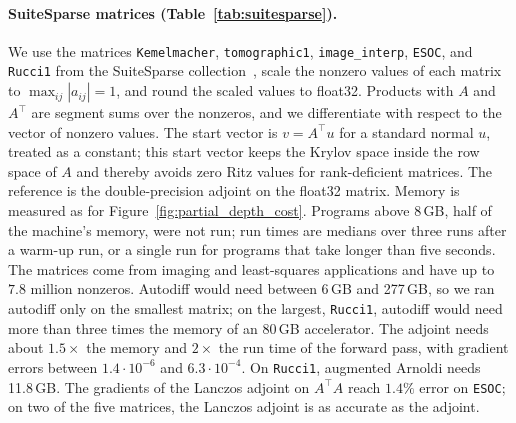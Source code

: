\documentclass[a4paper,12pt]{article}
\theoremstyle{definition}
\begin{document}
\paragraph{SuiteSparse matrices (Table~\ref{tab:suitesparse}).}
We use the matrices \texttt{Kemelmacher}, \texttt{tomographic1}, \texttt{image\_interp}, \texttt{ESOC}, and \texttt{Rucci1} from the SuiteSparse collection~\citep{davis2011university,kolodziej2019suitesparse}, scale the nonzero values of each matrix to $\max_{ij} |a_{ij}| = 1$, and round the scaled values to float32. Products with $A$ and $A^\top$ are segment sums over the nonzeros, and we differentiate with respect to the vector of nonzero values. The start vector is $v = A^\top u$ for a standard normal $u$, treated as a constant; this start vector keeps the Krylov space inside the row space of $A$ and thereby avoids zero Ritz values for rank-deficient matrices. The reference is the double-precision adjoint on the float32 matrix. Memory is measured as for Figure~\ref{fig:partial_depth_cost}. Programs above 8\,GB, half of the machine's memory, were not run; run times are medians over three runs after a warm-up run, or a single run for programs that take longer than five seconds. The matrices come from imaging and least-squares applications and have up to $7.8$ million nonzeros. Autodiff would need between 6\,GB and 277\,GB, so we ran autodiff only on the smallest matrix; on the largest, \texttt{Rucci1}, autodiff would need more than three times the memory of an 80\,GB accelerator. The adjoint needs about $1.5\times$ the memory and $2\times$ the run time of the forward pass, with gradient errors between $1.4 \cdot 10^{-6}$ and $6.3 \cdot 10^{-4}$. On \texttt{Rucci1}, augmented Arnoldi needs 11.8\,GB. The gradients of the Lanczos adjoint on $A^\top A$ reach $1.4\%$ error on \texttt{ESOC}; on two of the five matrices, the Lanczos adjoint is as accurate as the adjoint.
\end{document}
